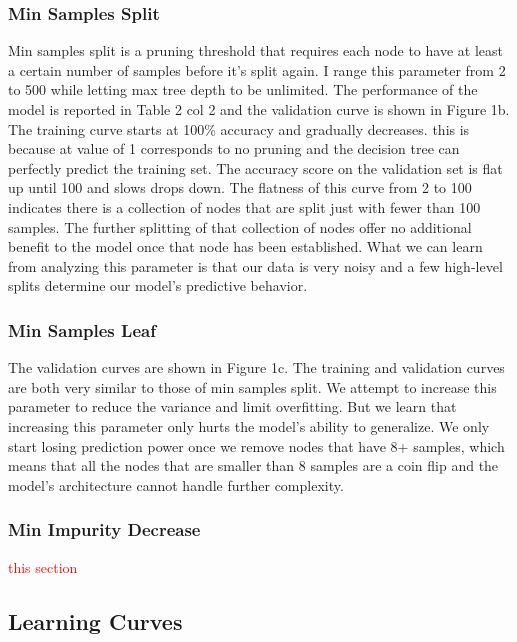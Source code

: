 \documentclass{article}
\newcommand\todo[1]{\textcolor{red}{#1}}
\begin{document}
\subsubsection*{Min Samples Split}
Min samples split is a pruning threshold that requires each node to have at least a certain number of samples before it's split again. I range this parameter from 2 to 500 while letting max tree depth to be unlimited. The performance of the model is reported in Table 2 col 2 and the validation curve is shown in Figure 1b. The training curve starts at 100\% accuracy and gradually decreases. this is because at value of 1 corresponds to no pruning and the decision tree can perfectly predict the training set. The accuracy score on the validation set is flat up until 100 and slows drops down. The flatness of this curve from 2 to 100 indicates there is a collection of nodes that are split just with fewer than 100 samples. The further splitting of that collection of nodes offer no additional benefit to the model once that node has been established. What we can learn from analyzing this parameter is that our data is very noisy and a few high-level splits determine our model's predictive behavior. 

\subsubsection*{Min Samples Leaf}
The validation curves are shown in Figure 1c. The training and validation curves are both very similar to those of min samples split. We attempt to increase this parameter to reduce the variance and limit overfitting. But we learn that increasing this parameter only hurts the model's ability to generalize. We only start losing prediction power once we remove nodes that have 8+ samples, which means that all the nodes that are smaller than 8 samples are a coin flip and the model's architecture cannot handle further complexity. 

\subsubsection*{Min Impurity Decrease}

\todo{ this section}


\subsection*{Learning Curves}
\end{document}
